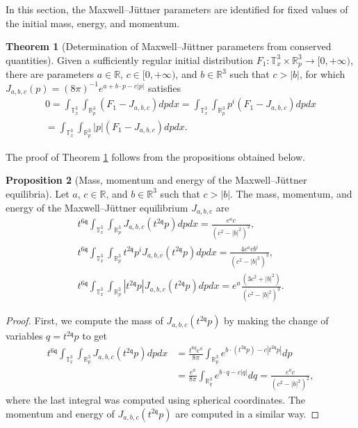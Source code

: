 \documentclass[reqno]{amsart}
\newcommand{\qq}{\mathfrak{q}}
\theoremstyle{definition}
\newtheorem{theorem}{Theorem}
\newtheorem{proposition}[theorem]{Proposition}
\numberwithin{equation}{section}
\numberwithin{theorem}{section}
\begin{document}
In this section, the Maxwell--J\"uttner parameters are identified for fixed values of the initial mass, energy, and momentum.


\begin{theorem}[Determination of Maxwell--J\"uttner parameters from conserved quantities]\label{thm:mjparamet}
    Given a sufficiently regular initial distribution \(F_1\colon \mathbb{T}^3_x\times \mathbb{R}^3_p\to [0,+\infty)\), there are parameters \(a\in \mathbb{R}\), \(c\in [0,+\infty)\), and \(b\in \mathbb{R}^3\) such that \(c>|b|\), for which 
\(
J_{a,b,c} (p)
=(8\pi)^{-1}e^{a+b \cdot  p-c|p|} 
\)
satisfies 
\begin{multline*}
  0=\int_{\mathbb{T}^3_x}\int_{ \mathbb{R}^3_p} (F_1-J_{a,b,c})dpdx= \int_{\mathbb{T}^3_x}\int_{ \mathbb{R}^3_p} p^i(F_1-J_{a,b,c})dpdx\\
= \int_{\mathbb{T}^3_x}\int_{ \mathbb{R}^3_p} |p|(F_1-J_{a,b,c})dpdx.   
\end{multline*}
\end{theorem}
   
The proof of Theorem \ref{thm:mjparamet} follows from the propositions obtained below.


\begin{proposition}[Mass, momentum and energy of the Maxwell--J\"uttner equilibria]
    Let \(a\), \(c\in \mathbb{R}\), and \(b\in \mathbb{R}^3\) such that \(c>|b|\).  The mass, momentum, and energy of the Maxwell--J\"uttner equilibrium \(J_{a,b,c}\) are
    \begin{align*}
    t^{6\qq}\int_{\mathbb{T}^3_x}\int_{ \mathbb{R}^3_p} J_{a,b,c} (t^{{2\qq}}p)dpdx=\frac{e^a c}{(c^2-|b|^2)^2},\\ t^{6\qq}\int_{\mathbb{T}^3_x}\int_{ \mathbb{R}^3_p} t^{2\qq}p^iJ_{a,b,c} (t^{{2\qq}}p)dpdx=\frac{4e^acb^i}{(c^2-|b|^2)^3},\\ t^{6\qq}\int_{\mathbb{T}^3_x}\int_{ \mathbb{R}^3_p} |t^{2\qq}p|J_{a,b,c} (t^{{2\qq}}p)dpdx=e^a\frac{(3c^2+|b|^2)}{(c^2-|b|^2)^3}.
    \end{align*}
\end{proposition}

\begin{proof}
    First, we compute the mass of \(J_{a,b,c} (t^{{2\qq}}p)\) by making the change of variables \(q=t^{2\qq}p\) to get
    \begin{align*}
            t^{6\qq}\int_{\mathbb{T}^3_x}\int_{ \mathbb{R}^3_p} J_{a,b,c} (t^{{2\qq}}p)dpdx
            &=\frac{t^{6q}e^a}{8\pi}\int_{\mathbb{R}^3_p} e^{b\cdot (t^{2\qq}p)-c|t^{2\qq}p|}dp
            \\
            &=\frac{e^a}{8\pi}\int_{\mathbb{R}^3_q} e^{b\cdot q-c|q|}dq=\frac{e^a c}{(c^2-|b|^2)^2},
    \end{align*}
 where the last integral was computed using spherical coordinates. The momentum and energy of \(J_{a,b,c} (t^{{2\qq}}p)\) are computed in a similar way.
\end{proof}
\end{document}
